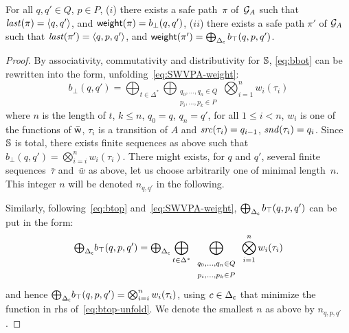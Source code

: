 \begin{lemma}[Completeness] \label{algo-complete}
For all $q, q' \in Q$, $p\in P$, 
($i$) there exists a safe path~$\pi$ of~$\mathcal{G}_A$ such that
$\last(\pi) = \< q, q'>$,
and $\mathsf{weight}(\pi) = b_\bot(q, q')$, 
($ii$) there exists a safe path $\pi'$ of $\mathcal{G}_A$ 
such that $\last(\pi') = \< q, p, q'>$,
and $\mathsf{weight}(\pi') = \bigoplus_{\Delta_\mathsf{c}} b_\top(q, p, q')$.
\end{lemma}
%
\begin{proof}
By associativity, commutativity and distributivity for $\mathbb{S}$,
\eqref{eq:bbot} can be rewritten into the form, unfolding~\eqref{eq:SWVPA-weight}:
%
\begin{equation}\label{eq:bbot-unfold}
b_\bot(q, q') = 
\bigoplus_{t\in \Delta^*} 
\bigoplus_{\begin{array}{c}
           \scriptstyle q_0,\ldots, q_n \in Q\\
           \scriptstyle p_{i},\ldots, p_{k} \in P
           \end{array}}
\bigotimes_{i=1}^n w_i(\tau_i)           
\end{equation}
%
where $n$ is the length of $t$, $k \leq n$,
$q_0 = q$, $q_n = q'$, 
for all $1 \leq i < n$, 
$w_i$ is one of the functions of $\bar{\mathsf{w}}$,
$\tau_i$ is a transition of $A$ and
$\mathit{src}(\tau_i) = q_{i-1}$, $\mathit{snd}(\tau_i) = q_i$.
%
Since $\mathbb{S}$ is total, there exists finite sequences as above such that
\( b_\bot(q, q') = \bigotimes_{i=i}^n w_i(\tau_i)\).
%
There might exists, for $q$ and $q'$,
several finite sequences~$\bar\tau$ and~$\bar{w}$ as above, 
let us choose arbitrarily one of minimal length~$n$. 
This integer $n$ will be denoted $n_{q, q'}$ in the following.

Similarly, following~\eqref{eq:btop} and~\eqref{eq:SWVPA-weight}, 
$\bigoplus_{\Delta_\mathsf{c}} b_\top(q, p, q')$ can be put in the form:
%
\begin{equation}\label{eq:btop-unfold}
{\textstyle\bigoplus_{\Delta_\mathsf{c}}} b_\top(q, p, q') = 
{\textstyle\bigoplus_{\Delta_\mathsf{c}}} \bigoplus_{t\in \Delta^*} 
\bigoplus_{\begin{array}{c}
           \scriptstyle q_0,\ldots, q_n \in Q\\
           \scriptstyle p_{i},\ldots, p_{k} \in P
           \end{array}}
\bigotimes_{i=1}^n w_i(\tau_i)           
\end{equation}
%
and hence 
\( {\textstyle\bigoplus_{\Delta_\mathsf{c}}} b_\top(q, p, q') = \bigotimes_{i=i}^n w_i(\tau_i) \),
using $c \in {\Delta_\mathsf{c}}$ that minimize the function in rhs of~\eqref{eq:btop-unfold}.
We denote the smallest $n$ as above by $n_{q, p, q'}$.


\end{proof}
